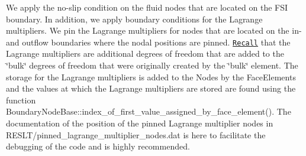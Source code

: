 We apply the no-\/slip condition on the fluid nodes that are located on the F\+SI boundary. In addition, we apply boundary conditions for the Lagrange multipliers. We pin the Lagrange multipliers for nodes that are located on the in-\/ and outflow boundaries where the nodal positions are pinned. \href{../../../solid/prescribed_displ_lagr_mult/html/index.html}{\tt Recall} that the Lagrange multipliers are additional degrees of freedom that are added to the \char`\"{}bulk\char`\"{} degrees of freedom that were originally created by the \char`\"{}bulk\char`\"{} element. The storage for the Lagrange multipliers is added to the Nodes by the Face\+Elements and the values at which the Lagrange multipliers are stored are found using the function {\ttfamily Boundary\+Node\+Base\+::index\+\_\+of\+\_\+first\+\_\+value\+\_\+assigned\+\_\+by\+\_\+face\+\_\+element()}. The documentation of the position of the pinned Lagrange multiplier nodes in {\ttfamily R\+E\+S\+L\+T/pinned\+\_\+lagrange\+\_\+multiplier\+\_\+nodes.\+dat} is here to facilitate the debugging of the code and is highly recommended.


